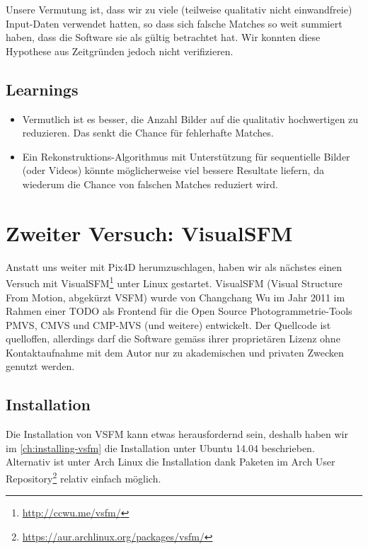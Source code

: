 Unsere Vermutung ist, dass wir zu viele (teilweise qualitativ nicht
einwandfreie) Input-Daten verwendet hatten, so dass sich falsche Matches so weit
summiert haben, dass die Software sie als gültig betrachtet hat. Wir konnten
diese Hypothese aus Zeitgründen jedoch nicht verifizieren.

\subsection{Learnings}

\begin{itemize}
	\item Vermutlich ist es besser, die Anzahl Bilder auf die qualitativ
		hochwertigen zu reduzieren. Das senkt die Chance für fehlerhafte Matches.
	\item Ein Rekonstruktions-Algorithmus mit Unterstützung für sequentielle
		Bilder (oder Videos) könnte möglicherweise viel bessere Resultate liefern,
		da wiederum die Chance von falschen Matches reduziert wird.
\end{itemize}


\section{Zweiter Versuch: VisualSFM}

Anstatt uns weiter mit Pix4D herumzuschlagen, haben wir als nächstes einen
Versuch mit VisualSFM\footnote{\url{http://ccwu.me/vsfm/}} unter Linux
gestartet. VisualSFM (Visual Structure From Motion, abgekürzt VSFM) wurde von
Changchang Wu im Jahr 2011 im Rahmen einer TODO als Frontend für die Open Source
Photogrammetrie-Tools PMVS, CMVS und CMP-MVS (und weitere)
entwickelt\cite{wu:2011}\cite{wu:2015}. Der Quellcode ist quelloffen, allerdings
darf die Software gemäss ihrer proprietären Lizenz ohne Kontaktaufnahme mit dem
Autor nur zu akademischen und privaten Zwecken genutzt werden.

\subsection{Installation}

Die Installation von VSFM kann etwas herausfordernd sein, deshalb haben wir im
\autoref{ch:installing-vsfm} die Installation unter Ubuntu 14.04 beschrieben.
Alternativ ist unter Arch Linux die Installation dank Paketen im Arch User
Repository\footnote{\url{https://aur.archlinux.org/packages/vsfm/}} relativ
einfach möglich.

